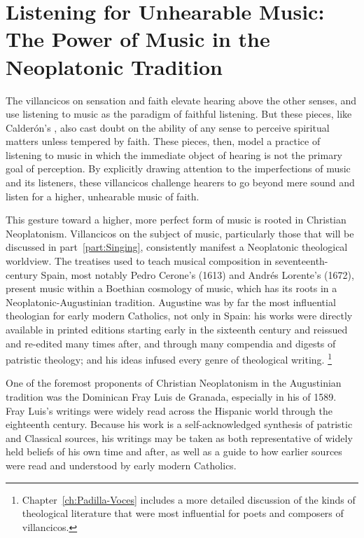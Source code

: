 \section{%
Listening for Unhearable Music:
The Power of Music in the Neoplatonic Tradition
}

The villancicos on sensation and faith elevate hearing above the other senses, and use listening to music as the paradigm of faithful listening.
But these pieces, like Calderón's , also cast doubt on the ability of any sense to perceive spiritual matters unless tempered by faith.
These pieces, then, model a practice of listening to music in which the immediate object of hearing is not the primary goal of perception.
By explicitly drawing attention to the imperfections of music and its listeners, these villancicos challenge hearers to go beyond mere sound and listen for a higher, unhearable music of faith.

This gesture toward a higher, more perfect form of music is rooted in Christian Neoplatonism.
Villancicos on the subject of music, particularly those that will be discussed in part~\ref{part:Singing}, consistently manifest a Neoplatonic theological worldview.
The treatises used to teach musical composition in seventeenth-century Spain, most notably Pedro Cerone's  (1613) and Andrés Lorente's  (1672), present music within a Boethian cosmology of music, which has its roots in a Neoplatonic-Augustinian tradition.
Augustine was by far the most influential theologian for early modern Catholics, not only in Spain: his works were directly available in printed editions starting early in the sixteenth century and reissued and re-edited many times after, and through many compendia and digests of patristic theology; and his ideas infused every genre of theological writing.%
	\footnote{%
	Chapter~\ref{ch:Padilla-Voces} includes a more detailed discussion of the kinds of theological literature that were most influential for poets and composers of villancicos.
	}

One of the foremost proponents of Christian Neoplatonism in the Augustinian tradition was the Dominican Fray Luis de Granada, especially in his   of 1589.
Fray Luis's writings were widely read across the Hispanic world through the eighteenth century. 
Because his work is a self-acknowledged synthesis of patristic and Classical sources, his writings may be taken as both representative of widely held beliefs of his own time and after, as well as a guide to how earlier sources were read and understood by early modern Catholics.

